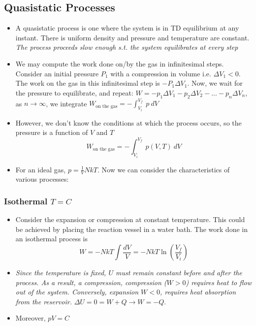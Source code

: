 \documentclass[8pt]{article}
\begin{document}
\subsection{Quasistatic Processes}
\begin{itemize}
    \item A quasistatic process is one where the system is in TD equilibrium at any instant. There is uniform density and pressure and temperature are constant. \textit{The process proceeds slow enough s.t. the system equilibrates at every step}
    \item We may compute the work done on/by the gas in infinitesimal steps. Consider an initial pressure $P_1$ with a compression in volume i.e. $\Delta V_1 < 0$. The work on the gas in this infinitesimal step is $-P_1 \Delta V_1$. Now, we wait for the pressure to equilibrate, and repeat: $W = -p_1 \Delta V_1 - p_2 \Delta V_2 - ... - p_n \Delta V_n$, as $n \rightarrow \infty$, we integrate  $
        W_{\text{on the gas}} = - \int_{V_i}^{V_{f}} \ p \ dV $
        \item However, we don't know the conditions at which the process occurs, so the pressure is a function of $V$ and $T$ \begin{equation}
            W_{\text{on the gas}} = - \int_{V_i}^{V_{f}} \ p(V,T) \ dV 
        \end{equation}
        \item For an ideal gas, $p = \frac{1}{V}NkT$. Now we can consider the characteristics of various processes: 
\end{itemize}

\subsubsection{Isothermal $T = C$}
\begin{itemize}
    \item Consider the expansion or compression at constant temperature. This could be achieved by placing the reaction vessel in a water bath. The work done in an isothermal process is \[W = - NkT \int \frac{dV}{V} = - NkT \ln (\frac{V_f}{V_i})\]
    \item \textit{Since the temperature is fixed, $U$ must remain constant before and after the process. As a result, a compression, compression ($W>0$) requires heat to flow out of the system. Conversely, expansion $W < 0$, requires heat absorption from the reservoir.} $\Delta U = 0 = W + Q \rightarrow W = - Q$. 
    \item Moreover, $pV = C$
\end{itemize}
\end{document}
